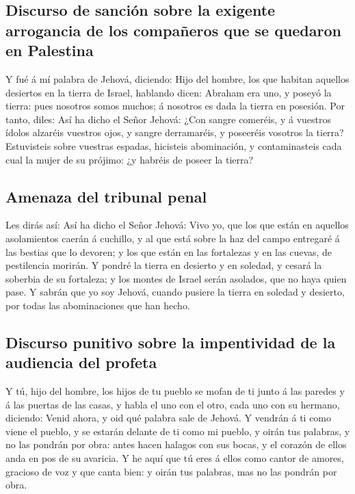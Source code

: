 \hypertarget{discurso-de-sanciuxf3n-sobre-la-exigente-arrogancia-de-los-compauxf1eros-que-se-quedaron-en-palestina}{%
\subsection{Discurso de sanción sobre la exigente arrogancia de los
compañeros que se quedaron en
Palestina}\label{discurso-de-sanciuxf3n-sobre-la-exigente-arrogancia-de-los-compauxf1eros-que-se-quedaron-en-palestina}}

 Y fué á mí palabra de Jehová, diciendo: 
Hijo del hombre, los que habitan aquellos desiertos en la tierra de
Israel, hablando dicen: Abraham era uno, y poseyó la tierra: pues
nosotros somos muchos; á nosotros es dada la tierra en posesión.
 Por tanto, diles: Así ha dicho el Señor Jehová: ¿Con
sangre comeréis, y á vuestros ídolos alzaréis vuestros ojos, y sangre
derramaréis, y poseeréis vosotros la tierra?  Estuvisteis
sobre vuestras espadas, hicisteis abominación, y contaminasteis cada
cual la mujer de su prójimo: ¿y habréis de poseer la tierra?

\hypertarget{amenaza-del-tribunal-penal}{%
\subsection{Amenaza del tribunal
penal}\label{amenaza-del-tribunal-penal}}

 Les dirás así: Así ha dicho el Señor Jehová: Vivo yo,
que los que están en aquellos asolamientos caerán á cuchillo, y al que
está sobre la haz del campo entregaré á las bestias que lo devoren; y
los que están en las fortalezas y en las cuevas, de pestilencia morirán.
 Y pondré la tierra en desierto y en soledad, y cesará la
soberbia de su fortaleza; y los montes de Israel serán asolados, que no
haya quien pase.  Y sabrán que yo soy Jehová, cuando
pusiere la tierra en soledad y desierto, por todas las abominaciones que
han hecho.

\hypertarget{discurso-punitivo-sobre-la-impentividad-de-la-audiencia-del-profeta}{%
\subsection{Discurso punitivo sobre la impentividad de la audiencia del
profeta}\label{discurso-punitivo-sobre-la-impentividad-de-la-audiencia-del-profeta}}

 Y tú, hijo del hombre, los hijos de tu pueblo se mofan
de ti junto á las paredes y á las puertas de las casas, y habla el uno
con el otro, cada uno con su hermano, diciendo: Venid ahora, y oid qué
palabra sale de Jehová.  Y vendrán á ti como viene el
pueblo, y se estarán delante de ti como mi pueblo, y oirán tus palabras,
y no las pondrán por obra: antes hacen halagos con sus bocas, y el
corazón de ellos anda en pos de su avaricia.  Y he aquí
que tú eres á ellos como cantor de amores, gracioso de voz y que canta
bien: y oirán tus palabras, mas no las pondrán por obra.

